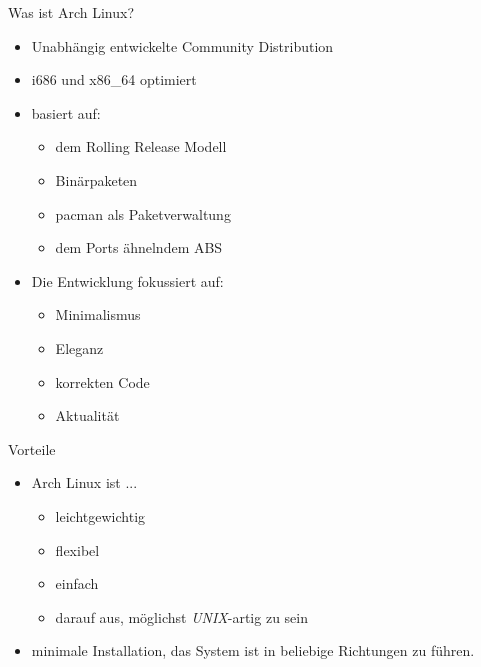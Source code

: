 
\begin{slide}{Was ist Arch Linux?}
	\begin{itemize}
		\item{Unabhängig entwickelte Community Distribution}
		\item{i686 und x86\_64 optimiert}
		\item{basiert auf:
			\begin{itemize}
				\item{dem Rolling Release Modell}
				\item{Binärpaketen}
				\item{pacman als Paketverwaltung}
				\item{dem Ports ähnelndem ABS}
			\end{itemize}
		}
		\item{Die Entwicklung fokussiert auf:
			\begin{itemize}
				\item{Minimalismus}
				\item{Eleganz}
				\item{korrekten Code}
				\item{Aktualität}
			\end{itemize}
		}
	\end{itemize}
\end{slide}

\begin{slide}{Vorteile}
	\begin{itemize}
		\item{Arch Linux ist ...
			\begin{itemize}
				\item{leichtgewichtig}
				\item{flexibel}
				\item{einfach}
				\item{darauf aus, möglichst \textit{UNIX}-artig zu sein}
			\end{itemize}
		}
		\item{minimale Installation, das System ist in beliebige Richtungen zu führen.}
	\end{itemize}
\end{slide}
